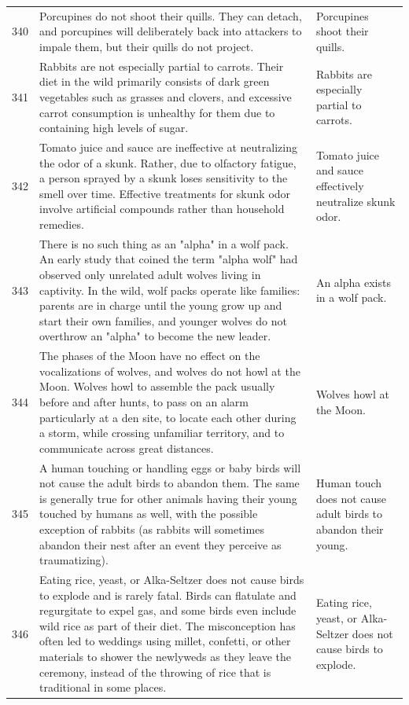\begin{tabular}{c|p{}|p{}}
340 & Porcupines do not shoot their quills. They can detach, and porcupines will deliberately back into attackers to impale them, but their quills do not project. & Porcupines shoot their quills. \\
341 & Rabbits are not especially partial to carrots. Their diet in the wild primarily consists of dark green vegetables such as grasses and clovers, and excessive carrot consumption is unhealthy for them due to containing high levels of sugar. & Rabbits are especially partial to carrots. \\
342 & Tomato juice and sauce are ineffective at neutralizing the odor of a skunk. Rather, due to olfactory fatigue, a person sprayed by a skunk loses sensitivity to the smell over time. Effective treatments for skunk odor involve artificial compounds rather than household remedies. & Tomato juice and sauce effectively neutralize skunk odor. \\
343 & There is no such thing as an "alpha" in a wolf pack. An early study that coined the term "alpha wolf" had observed only unrelated adult wolves living in captivity. In the wild, wolf packs operate like families: parents are in charge until the young grow up and start their own families, and younger wolves do not overthrow an "alpha" to become the new leader. & An alpha exists in a wolf pack. \\
344 & The phases of the Moon have no effect on the vocalizations of wolves, and wolves do not howl at the Moon. Wolves howl to assemble the pack usually before and after hunts, to pass on an alarm particularly at a den site, to locate each other during a storm, while crossing unfamiliar territory, and to communicate across great distances. & Wolves howl at the Moon. \\
345 & A human touching or handling eggs or baby birds will not cause the adult birds to abandon them. The same is generally true for other animals having their young touched by humans as well, with the possible exception of rabbits (as rabbits will sometimes abandon their nest after an event they perceive as traumatizing). & Human touch does not cause adult birds to abandon their young. \\
346 & Eating rice, yeast, or Alka-Seltzer does not cause birds to explode and is rarely fatal. Birds can flatulate and regurgitate to expel gas, and some birds even include wild rice as part of their diet. The misconception has often led to weddings using millet, confetti, or other materials to shower the newlyweds as they leave the ceremony, instead of the throwing of rice that is traditional in some places. & Eating rice, yeast, or Alka-Seltzer does not cause birds to explode. \\

\end{tabular}
